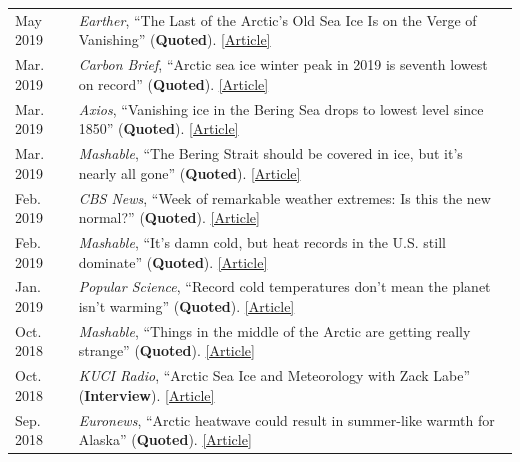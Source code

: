 \documentclass[margin,line,palatino,courier,10pt]{res}
\begin{document}
\begin{resume}
\begin{tabular}{@{}p{0.9in}p{4in}}
May 2019 & \textit{Earther}, ``The Last of the Arctic's Old Sea Ice Is on the Verge of Vanishing'' (\textbf{Quoted}). \href{https://earther.gizmodo.com/the-last-of-the-arctics-old-sea-ice-is-on-the-verge-of-1834510753}{[Article]}\\
Mar. 2019 & \textit{Carbon Brief}, ``Arctic sea ice winter peak in 2019 is seventh lowest on record'' (\textbf{Quoted}). \href{https://www.carbonbrief.org/arctic-sea-ice-winter-peak-in-2019-is-seventh-lowest-on-record}{[Article]}\\
Mar. 2019 & \textit{Axios}, ``Vanishing ice in the Bering Sea drops to lowest level since 1850'' (\textbf{Quoted}). \href{https://www.axios.com/bering-sea-ice-vanishing-a23bacda-a08d-4ec7-9124-419b90b984a2.html}{[Article]}\\
Mar. 2019 &\textit{Mashable}, ``The Bering Strait should be covered in ice, but it's nearly all gone'' (\textbf{Quoted}). \href{https://mashable.com/article/bering-strait-sea-ice-gone-2019-arctic/#zs3hdvbg3mqc}{[Article]}\\
Feb. 2019 & \textit{CBS News}, ``Week of remarkable weather extremes: Is this the new normal?'' (\textbf{Quoted}). \href{https://www.cbsnews.com/news/remarkable-weather-extremes-is-this-the-new-normal-climate-change/?ftag=CNM-00-10aab7e&linkId=64169123}{[Article]}\\
Feb. 2019 & \textit{Mashable}, ``It's damn cold, but heat records in the U.S. still dominate'' (\textbf{Quoted}). \href{https://mashable.com/article/polar-vortex-climate-change-cold-record/#xQmvXhcFJPqH}{[Article]}\\
Jan. 2019 & \textit{Popular Science}, ``Record cold temperatures don't mean the planet isn't warming'' (\textbf{Quoted}). \href{https://www.popsci.com/cold-weather-climate-change}{[Article]}\\
Oct. 2018 & \textit{Mashable}, ``Things in the middle of the Arctic are getting really strange'' (\textbf{Quoted}). \href{https://mashable.com/article/low-arctic-ice-central-basin/#xQmvXhcFJPqH}{[Article]}\\
Oct. 2018 & \textit{KUCI Radio}, ``Arctic Sea Ice and Meteorology with Zack Labe'' (\textbf{Interview}). \href{https://thesciencespiel.org/2018/10/08/october-8-2018-arctic-sea-ice-and-meteorology-with-zack-labe/}{[Article]}\\
Sep. 2018 & \textit{Euronews}, ``Arctic heatwave could result in summer-like warmth for Alaska'' (\textbf{Quoted}). \href{https://www.euronews.com/2018/09/29/arctic-heatwave-could-result-in-summer-like-warmth-in-alaska}{[Article]}\\

\end{tabular}
\end{resume}
\end{document}
